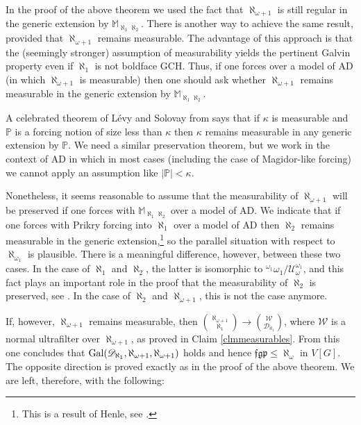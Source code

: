 \documentclass[11pt]{amsart}
\theoremstyle{definition}
\theoremstyle{remark}
\begin{document}
In the proof of the above theorem we used the fact that $\aleph_{\omega+1}$ is still regular in the generic extension by $\mathbb{M}_{\aleph_1\aleph_2}$.
There is another way to achieve the same result, provided that $\aleph_{\omega+1}$ remains measurable.
The advantage of this approach is that the (seemingly stronger) assumption of measurability yields the pertinent Galvin property even if $\aleph_1$ is not boldface \textsf{GCH}.
Thus, if one forces over a model of \textsf{AD} (in which $\aleph_{\omega+1}$ is measurable) then one should ask whether $\aleph_{\omega+1}$ remains measurable in the generic extension by $\mathbb{M}_{\aleph_1\aleph_2}$.

A celebrated theorem of L\'evy and Solovay from \cite{MR224458} says that if $\kappa$ is measurable and $\mathbb{P}$ is a forcing notion of size less than $\kappa$ then $\kappa$ remains measurable in any generic extension by $\mathbb{P}$.
We need a similar preservation theorem, but we work in the context of \textsf{AD} in which in most cases (including the case of Magidor-like forcing) we cannot apply an assumption like $|\mathbb{P}|<\kappa$.

Nonetheless, it seems reasonable to assume that the measurability of $\aleph_{\omega+1}$ will be preserved if one forces with $\mathbb{M}_{\aleph_1\aleph_2}$ over a model of \textsf{AD}.
We indicate that if one forces with Prikry forcing into $\aleph_1$ over a model of \textsf{AD} then $\aleph_2$ remains measurable in the generic extension,\footnote{This is a result of Henle, see \cite[Proposition 3.5]{MR722169}.} so the parallel situation with respect to $\aleph_{\omega_1}$ is plausible.
There is a meaningful difference, however, between these two cases.
In the case of $\aleph_1$ and $\aleph_2$, the latter is isomorphic to ${}^{\omega_1}\omega_1/\mathscr{U}^{\omega_1}_\omega$, and this fact plays an important role in the proof that the measurability of $\aleph_2$ is preserved, see \cite[Proposition 3.5]{MR722169}.
In the case of $\aleph_2$ and $\aleph_{\omega+1}$, this is not the case anymore.

If, however, $\aleph_{\omega+1}$ remains measurable, then $\binom{\aleph_{\omega+1}}{\aleph_1}\rightarrow\binom{\mathscr{W}}{\mathscr{D}_{\aleph_1}}$, where $\mathscr{W}$ is a normal ultrafilter over $\aleph_{\omega+1}$, as proved in Claim \ref{clmmeasurables}.
From this one concludes that ${\rm Gal}(\mathscr{D}_{\aleph_1},\aleph_{\omega+1},\aleph_{\omega+1})$ holds and hence $\mathfrak{fgp}\leq\aleph_\omega$ in $V[G]$.
The opposite direction is proved exactly as in the proof of the above theorem.
We are left, therefore, with the following:
\end{document}
